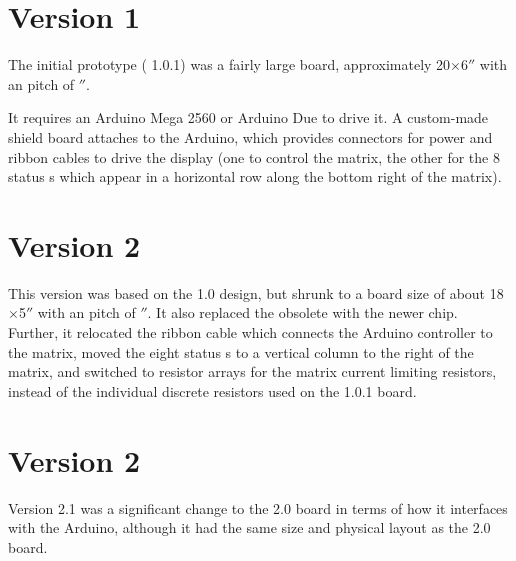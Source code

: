 \section{Version 1}
The initial prototype ( 1.0.1) was a fairly large board, approximately 20$\times$6$''$
with an  pitch of $''$.

It requires an Arduino Mega 2560 or Arduino Due to drive it. A custom-made shield board attaches to
the Arduino, which provides connectors for power and ribbon cables to drive the display (one to control
the matrix, the other for the 8 status s which appear in a horizontal row along the bottom
right of the matrix).


\section{Version 2}
This version was based on the 1.0 design, but shrunk to a board size of about 18$\times$5$''$
with an  pitch of $''$. It also replaced the obsolete  with the newer  chip.
Further, it relocated the ribbon cable which connects the Arduino controller to the  matrix, moved the
eight status s to a vertical column to the right of the matrix, and switched to resistor arrays
for the matrix current limiting resistors, instead of the individual discrete resistors used on the 1.0.1 board.

\section{Version 2}
Version 2.1 was a significant change to the 2.0 board in terms of how it interfaces with the Arduino, although it had the same size and physical
layout as the 2.0 board.

